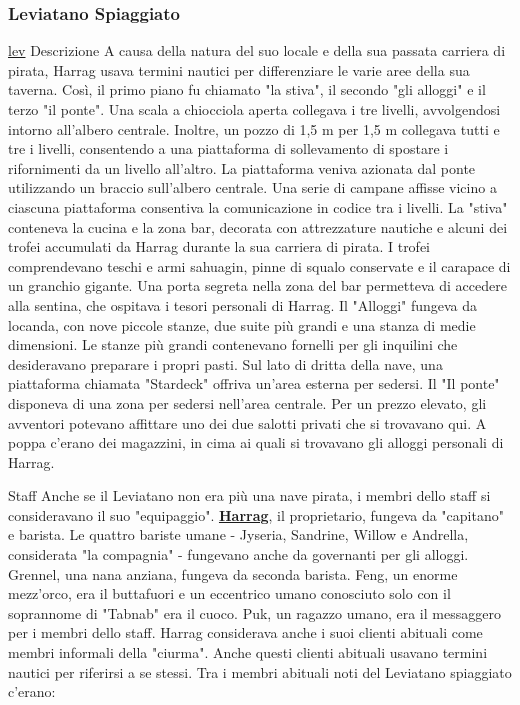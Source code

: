 \documentclass{article}
\begin{document}
              \subsubsection{Leviatano Spiaggiato}
\hyperlink{leviatano}{lev}
Descrizione\newline
A causa della natura del suo locale e della sua passata carriera di pirata, Harrag usava termini nautici per differenziare le varie aree della sua taverna. Così, il primo piano fu chiamato "la stiva", il secondo "gli alloggi" e il terzo "il ponte". Una scala a chiocciola aperta collegava i tre livelli, avvolgendosi intorno all'albero centrale. Inoltre, un pozzo di 1,5 m per 1,5 m  collegava tutti e tre i livelli, consentendo a una piattaforma di sollevamento di spostare i rifornimenti da un livello all'altro. La piattaforma veniva azionata dal ponte utilizzando un braccio sull'albero centrale. Una serie di campane affisse vicino a ciascuna piattaforma consentiva la comunicazione in codice tra i livelli.\newline
La "stiva" conteneva la cucina e la zona bar, decorata con attrezzature nautiche e alcuni dei trofei accumulati da Harrag durante la sua carriera di pirata. I trofei comprendevano teschi e armi sahuagin, pinne di squalo conservate e il carapace di un granchio gigante. Una porta segreta nella zona del bar permetteva di accedere alla sentina, che ospitava i tesori personali di Harrag.\newline
Il "Alloggi" fungeva da locanda, con nove piccole stanze, due suite più grandi e una stanza di medie dimensioni. Le stanze più grandi contenevano fornelli per gli inquilini che desideravano preparare i propri pasti. Sul lato di dritta della nave, una piattaforma chiamata "Stardeck" offriva un'area esterna per sedersi.\newline
Il "Il ponte" disponeva di una zona per sedersi nell'area centrale. Per un prezzo elevato, gli avventori potevano affittare uno dei due salotti privati che si trovavano qui. A poppa c'erano dei magazzini, in cima ai quali si trovavano gli alloggi personali di Harrag.

Staff\newline
Anche se il Leviatano non era più una nave pirata, i membri dello staff si consideravano il suo "equipaggio". \hyperlink{harrag}{\textbf{Harrag}}, il proprietario, fungeva da "capitano" e barista. Le quattro bariste umane - Jyseria, Sandrine, Willow e Andrella, considerata "la compagnia" - fungevano anche da governanti per gli alloggi. Grennel, una nana anziana, fungeva da seconda barista. Feng, un enorme mezz'orco, era il buttafuori e un eccentrico umano conosciuto solo con il soprannome di "Tabnab" era il cuoco. Puk, un ragazzo umano, era il messaggero per i membri dello staff. Harrag considerava anche i suoi clienti abituali come membri informali della "ciurma". Anche questi clienti abituali usavano termini nautici per riferirsi a se stessi. Tra i membri abituali noti del Leviatano spiaggiato c'erano:
\end{document}
